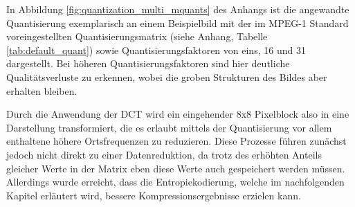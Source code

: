 In Abbildung \ref{fig:quantization_multi_mquants} des Anhangs ist die angewandte Quantisierung exemplarisch an einem Beispielbild mit der im MPEG-1 Standard voreingestellten Quantisierungsmatrix (siehe Anhang, Tabelle \ref{tab:default_quant}) sowie Quantisierungsfaktoren von eins, 16 und 31 dargestellt. %
Bei höheren Quantisierungsfaktoren sind hier deutliche Qualitätsverluste zu erkennen, wobei die groben Strukturen des Bildes aber erhalten bleiben.

Durch die Anwendung der DCT wird ein eingehender 8x8 Pixelblock also in eine Darstellung transformiert, die es erlaubt mittels der Quantisierung vor allem enthaltene höhere Ortsfrequenzen zu reduzieren. Diese Prozesse führen zunächst jedoch nicht direkt zu einer Datenreduktion, da trotz des erhöhten Anteils gleicher Werte in der Matrix eben diese Werte auch gespeichert werden müssen. Allerdings wurde erreicht, dass die Entropiekodierung, welche im nachfolgenden Kapitel erläutert wird, bessere Kompressionsergebnisse erzielen kann.

